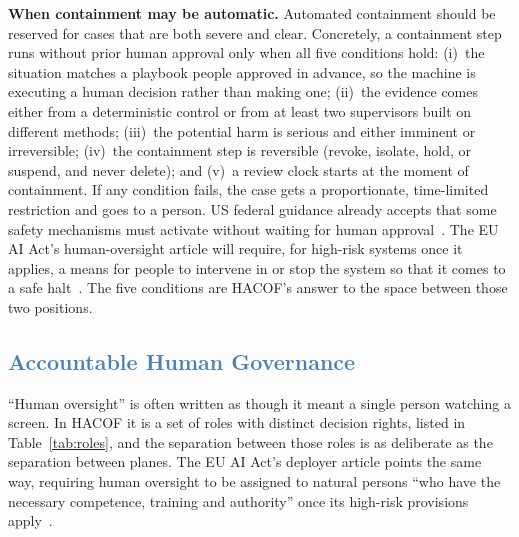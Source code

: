 \documentclass[journal]{IEEEtran}
\newcommand{\hacof}{HACOF}
\begin{document}
\textbf{When containment may be automatic.} Automated containment should be reserved for cases that are both severe and clear. Concretely, a containment step runs without prior human approval only when all five conditions hold: (i)~the situation matches a playbook people approved in advance, so the machine is executing a human decision rather than making one; (ii)~the evidence comes either from a deterministic control or from at least two supervisors built on different methods; (iii)~the potential harm is serious and either imminent or irreversible; (iv)~the containment step is reversible (revoke, isolate, hold, or suspend, and never delete); and (v)~a review clock starts at the moment of containment. If any condition fails, the case gets a proportionate, time-limited restriction and goes to a person. US federal guidance already accepts that some safety mechanisms must activate without waiting for human approval~\cite{omb2025m2521}.
The EU AI Act's human-oversight article will require, for high-risk systems once it applies, a means for people to intervene in or stop the system so that it comes to a safe halt~\cite{euaiact2024}.
The five conditions are \hacof's answer to the space between those two positions.

\subsection{\textcolor{steelblue}{Accountable Human Governance}}
\label{sec:hacof-human}

``Human oversight'' is often written as though it meant a single person watching a screen. In \hacof{} it is a set of roles with distinct decision rights, listed in Table~\ref{tab:roles}, and the separation between those roles is as deliberate as the separation between planes. The EU AI Act's deployer article points the same way, requiring human oversight to be assigned to natural persons ``who have the necessary competence, training and authority'' once its high-risk provisions apply~\cite{euaiact2024,euaiomnibus2026}.
\end{document}
